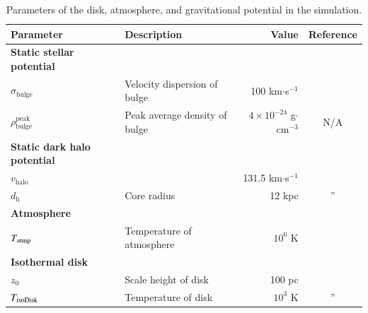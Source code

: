 \documentclass[twocolumn]{aastex631}
\begin{document}
\begin{table}[t]
\raggedright
\caption{Parameters of the disk, atmosphere, and gravitational potential in the simulation.}
\label{table-parameters}
\begin{tabular}{@{}llrc@{}}
\toprule[1pt]\midrule[0.3pt]
Parameter                             & Description                               & Value                                &  Reference                     \\ \midrule
{\bf Static stellar potential }       &                                           &                                      &                                \\
$\sigma_{\text{bulge}}$               & Velocity dispersion of bulge              & 100 km$\cdot$s$^{-1}$                & \citep{velocity-dispersion-MW} \\
$\rho_{\text{bulge}}^{\text{peak}}$   & Peak average density of bulge             & $4\times 10^{-24}$ g$\cdot$cm$^{-3}$ &   N/A                          \\ \hline
{\bf Static dark halo potential }     &                                           &                                      &                                \\
$v_{\text{halo}}$                     &                                           & 131.5 km$\cdot$s$^{-1}$              & \citep{Johnston1995}           \\
$d_{\text{h}}$                        & Core radius                               & 12 kpc                               & \multicolumn{1}{c}{''}         \\ \hline
{\bf Atmosphere }                     &                                           &                                      &                                \\
$T_{\text{\text{atmp}}}$              & Temperature of atmosphere                 & $10^{6}$ K                           & \citep{temperature-MW}         \\ \hline
{\bf Isothermal disk }                &                                           &                                      &                                \\
$z_{0}$                               & Scale height of disk                      & 100 pc                               & \citep{peak-ism-density}       \\
$T_{\text{\text{isoDisk}}}$           & Temperature of disk                       & $10^{3}$ K                           & \multicolumn{1}{c}{''}         \\

\end{tabular}
\end{table}
\end{document}

